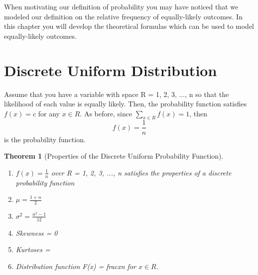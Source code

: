 \documentclass[10pt,]{book}
\theoremstyle{plain}
\newtheorem{theorem}{Theorem}[section]
\theoremstyle{definition}
\theoremstyle{definition}
\theoremstyle{definition}
\numberwithin{equation}{section}
\begin{document}
	When motivating our definition of probability you may have noticed that we modeled our definition on the relative frequency of equally-likely outcomes. In this chapter you will develop the theoretical formulas which can be used to model equally-likely outcomes.
\typeout{************************************************}
\typeout{************************************************}
\section[Discrete Uniform Distribution]{Discrete Uniform Distribution}\label{section-27}

	Assume that you have a variable with space R = {1, 2, 3, ..., n} so that the likelihood of each value is equally likely. Then, the probability function satisfies \(f(x) = c\) for any \(x \in R\).  As before, since \(\sum_{x \in R} f(x) = 1\), then \begin{equation*}f(x) = \frac{1}{n}\end{equation*} is the probability function.
\begin{theorem}[Properties of the Discrete Uniform Probability Function]\label{theorem-31}
\leavevmode%
\begin{enumerate}
\item\hypertarget{li-150}{}\(f(x) = \frac{1}{n}\) over R = {1, 2, 3, ..., n} satisfies the properties of a discrete probability function%
\item\hypertarget{li-151}{}\(\mu = \frac{1+n}{2}\)%
\item\hypertarget{li-152}{}\(\sigma^2 = \frac{n^2-1}{12}\)%
\item\hypertarget{li-153}{}Skewness = 0%
\item\hypertarget{li-154}{}Kurtoses = %
\item\hypertarget{li-155}{}Distribution function F(x) = frac{x}{n} for \(x \in R\).%
\end{enumerate}
\end{theorem}
\end{document}
